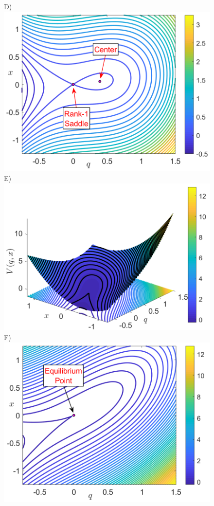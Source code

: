 \documentclass[8pt]{article}
\begin{document}
\begin{figure}[htbp]
\begin{center}
		D)\includegraphics[scale=0.23]{fig6d.png}
		E)\includegraphics[scale=0.25]{fig6e.png}
		F)\includegraphics[scale=0.23]{fig6f.png}
	\end{center}
	

\end{figure}
\end{document}
